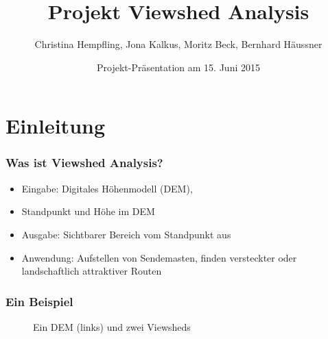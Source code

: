 \documentclass{beamer}
\begin{document}
\subject{Algorithmen für geographische Informationssysteme}
\title{Projekt Viewshed Analysis}
\author{Christina Hempfling, Jona Kalkus, Moritz Beck, Bernhard Häussner}
\date{Projekt-Präsentation am 15. Juni 2015}
\maketitle


\section{Einleitung}

\begin{frame}
  \frametitle{Was ist Viewshed Analysis?}
  \begin{itemize}[<+->]
    \item Eingabe: Digitales Höhenmodell (DEM),
    \item Standpunkt und Höhe im DEM
    \item Ausgabe: Sichtbarer Bereich vom Standpunkt aus
    \item Anwendung: Aufstellen von Sendemasten, finden versteckter oder landschaftlich attraktiver Routen
  \end{itemize}
\end{frame}

\begin{frame}
  \frametitle{Ein Beispiel}
  \begin{figure}[h]
    \centering
    \caption{Ein DEM (links) und zwei Viewsheds}
    \label{fig:example}
  \end{figure}
\end{frame}
\end{document}
